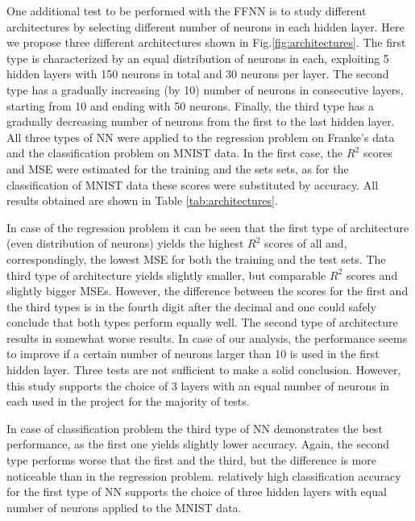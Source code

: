 \documentclass{emulateapj}
\begin{document}
One additional test to be performed with the FFNN is to study different architectures by selecting different number of neurons in each hidden layer. Here we propose three different architectures shown in Fig.\ref{fig:architectures}. The first type is characterized by an equal distribution of neurons in each, exploiting 5 hidden layers with 150 neurons in total and 30 neurons per layer. The second type has a gradually increasing (by 10) number of neurons in consecutive layers, starting from 10 and ending with 50 neurons. Finally, the third type has a gradually decreasing number of neurons from the first to the last hidden layer. All three types of NN were applied to the regression problem on Franke's data and the classification problem on MNIST data. In the first case, the $R^2$ scores and MSE were estimated for the training and the sets sets, as for the classification of MNIST data these scores were substituted by accuracy. All results obtained are shown in Table \ref{tab:architectures}.

In case of the regression problem it can be seen that the first type of architecture (even distribution of neurons) yields the highest $R^2$ scores of all and, correspondingly, the lowest MSE for both the training and the test sets. The third type of architecture yields slightly smaller, but comparable $R^2$ scores and slightly bigger MSEs. However, the difference between the scores for the first and the third types is in the fourth digit after the decimal and one could safely conclude that both types perform equally well. The second type of architecture results in somewhat worse results. In case of our analysis, the performance seems to improve if a certain number of neurons larger than 10 is used in the first hidden layer. Three tests are not sufficient to make a solid conclusion. However, this study supports the choice of 3 layers with an equal number of neurons in each used in the project for the majority of tests.

In case of classification problem the third type of NN demonstrates the best performance, as the first one yields slightly lower accuracy. Again, the second type performs worse that the first and the third, but the difference is more noticeable than in the regression problem. relatively high classification accuracy for the first type of NN supports the choice of three hidden layers with equal number of neurons applied to the MNIST data.
\end{document}
